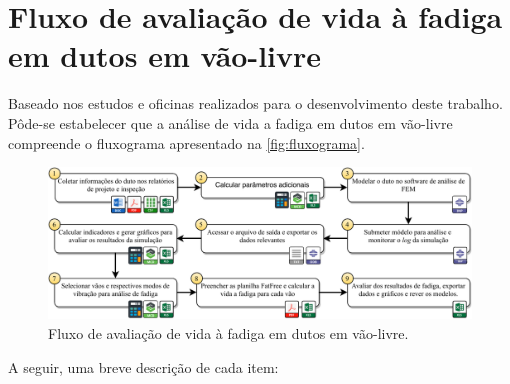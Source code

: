 \section{Fluxo de avaliação de vida à fadiga em dutos em vão-livre}\label{sec:workflow}


Baseado nos estudos e oficinas realizados para o desenvolvimento deste trabalho. Pôde-se estabelecer que a análise de vida a fadiga em dutos em vão-livre compreende o fluxograma apresentado na \autoref{fig:fluxograma}. %

\begin{figure}[!ht]
    \centering
    \caption{Fluxo de avaliação de vida à fadiga em dutos em vão-livre.}\label{fig:fluxograma}
    \includegraphics[width=\textwidth]{imagens/fluxograma.pdf}
\end{figure}

A seguir, uma breve descrição de cada item:

